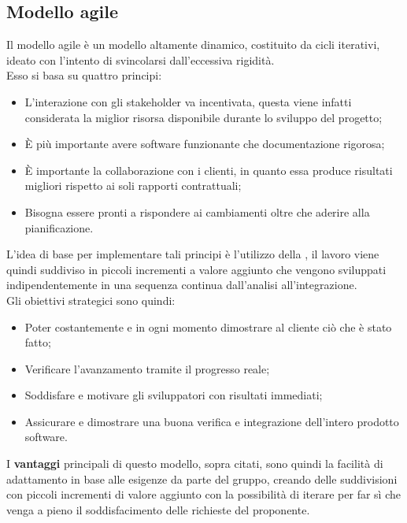 \subsection{Modello agile}
\label{sec:modello_agile}
Il modello agile è un modello altamente dinamico, costituito da cicli iterativi, ideato con l'intento di svincolarsi dall'eccessiva rigidità.\\ Esso si basa su quattro principi:
	\begin{itemize}
		\item L'interazione con gli stakeholder va incentivata, questa viene infatti considerata la miglior risorsa disponibile durante lo sviluppo del progetto;
		\item È più importante avere software funzionante che documentazione rigorosa;
		\item È importante la collaborazione con i clienti, in quanto essa produce risultati migliori rispetto ai soli rapporti contrattuali;
		\item Bisogna essere pronti a rispondere ai cambiamenti oltre che aderire alla pianificazione.
	\end{itemize}
L'idea di base per implementare tali principi è l'utilizzo della , il lavoro viene quindi suddiviso in piccoli incrementi a valore aggiunto che vengono sviluppati indipendentemente in una sequenza continua dall'analisi all'integrazione.\\ Gli obiettivi strategici sono quindi:
	\begin{itemize}
		\item Poter costantemente e in ogni momento dimostrare al cliente ciò che è stato fatto;
		\item Verificare l'avanzamento tramite il progresso reale;
		\item Soddisfare e motivare gli sviluppatori con risultati immediati;
		\item Assicurare e dimostrare una buona verifica e integrazione dell'intero prodotto software. 
	\end{itemize}
I \textbf{vantaggi} principali di questo modello, sopra citati, sono quindi la facilità di adattamento in base alle esigenze da parte del gruppo, creando delle suddivisioni con piccoli incrementi di valore aggiunto con la possibilità di iterare per far sì che venga a pieno il soddisfacimento delle richieste del proponente.

